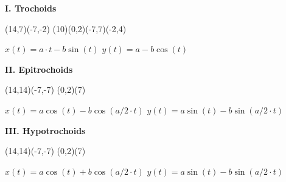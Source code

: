 \begin{center}
{\Huge \bf{I. Trochoids}}
\bigskip

\begin{lapdf}(14,7)(-7,-2)
 \Lingrid(10)(0,2)(-7,7)(-2,4)
\end{lapdf}

$x(t)=a \cdot t - b\sin(t)$ \qquad$y(t)=a-b\cos(t)$

\newpage

{\Huge\bf{II. Epitrochoids}}
\bigskip

\begin{lapdf}(14,14)(-7,-7)
 \Polgrid(0,2)(7)
\end{lapdf}

$x(t)=a\cos(t)-b\cos(a/2 \cdot t)$ \qquad $y(t)=a\sin(t)-b\sin(a/2 \cdot t)$

\newpage

{\Huge\bf{III. Hypotrochoids}}
\bigskip

\begin{lapdf}(14,14)(-7,-7)
 \Resetcol
 \Polgrid(0,2)(7)
\end{lapdf}

$x(t)=a\cos(t)+b\cos(a/2 \cdot t)$ \qquad $y(t)=a\sin(t)-b\sin(a/2 \cdot t)$
\end{center}

